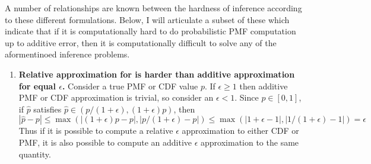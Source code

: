 \documentclass{article}
\theoremstyle{definition}
\theoremstyle{remark}
\begin{document}
A number of relationships are known between the hardness of inference according to these different formulations.
Below, I will articulate a subset of these which indicate that if it is computationally hard to do 
probabilistic PMF computation up to additive error, then it is computationally difficult to solve any of the aformentinoed inference problems.

\begin{enumerate}
    \item \textbf{Relative approximation for is harder than additive approximation for equal $\epsilon$.}
    Consider a true PMF or CDF value $p$. If $\epsilon \geq 1$ then additive PMF or CDF approximation is trivial, so consider an $\epsilon < 1$.
    Since $p \in [0, 1]$, if $\hat{p}$ satisfies $\hat{p} \in (p/(1+\epsilon), (1+\epsilon)p)$, then $$|\hat{p} - p| \leq \max(|(1 + \epsilon)p - p|, |p/(1+\epsilon) - p|) \leq \max(|1 + \epsilon - 1|, |1/(1+\epsilon) - 1|) = \epsilon$$
    Thus if it is possible to compute a relative $\epsilon$ approximation to either CDF or PMF, it is also possible to compute an additive $\epsilon$ approximation to the same quantity.


\end{enumerate}
\end{document}

